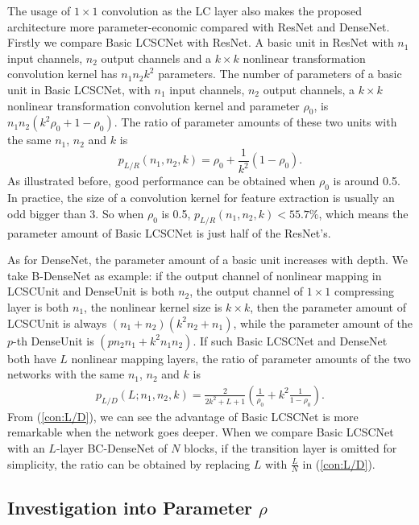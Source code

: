 \documentclass[journal]{IEEEtran}
\begin{document}
The usage of $1 \times 1$ convolution as the LC layer also makes the proposed architecture more parameter-economic compared with ResNet and DenseNet. Firstly we compare Basic LCSCNet with ResNet. A basic unit in ResNet with $n_1$ input channels, $n_2$ output channels and a $k\times k$ nonlinear transformation convolution kernel has $n_1 n_2 k^2$ parameters. The number of parameters of a basic unit in Basic LCSCNet, with $n_1$ input channels, $n_2$ output channels, a $k\times k$ nonlinear transformation convolution kernel and parameter $\rho_0$, is $n_1n_2(k^2\rho_0+1-\rho_0)$. The ratio of parameter amounts of these two units with the same $n_1$, $n_2$ and $k$ is 
\begin{equation}
p_{L/R}(n_1,n_2,k)=\rho_0+\frac{1}{k^2}(1-\rho_0).
\label{con:L/R}
\end{equation}
As illustrated before, good performance can be obtained when $\rho_0$ is around 0.5. In practice, the size of a convolution kernel for feature extraction is usually an odd bigger than 3. So when $\rho_0$ is 0.5, $p_{L/R}(n_1,n_2,k)<55.7\%$, which means the parameter amount of Basic LCSCNet is just half of the ResNet's. 

As for DenseNet, the parameter amount of a basic unit increases with depth. We take B-DenseNet as example: if the output channel of nonlinear mapping in LCSCUnit and DenseUnit is both $n_{2}$, the output channel of $1\times 1$ compressing layer is both $n_{1}$, the nonlinear kernel size is $k\times k$, then the parameter amount of LCSCUnit is always  $(n_{1}+n_{2})(k^{2}n_{2}+n_{1})$, while the parameter amount of the $p$-th DenseUnit is $(pn_{2}n_{1}+k^{2}n_{1}n_{2})$. If such Basic LCSCNet and DenseNet both have $L$ nonlinear mapping layers, the ratio of parameter amounts of the two networks with the same $n_{1}$, $n_{2}$ and $k$ is 
\begin{equation}
\begin{split}
p_{L/D}(L;n_1,n_2,k)=\frac{2}{2k^{2}+L+1}(\frac{1}{\rho_0}+k^{2}\frac{1}{1-\rho_0}).
\end{split}
\label{con:L/D}
\end{equation}
From (\ref{con:L/D}), we can see the advantage of Basic LCSCNet is more remarkable when the network goes deeper. 
When we compare Basic LCSCNet with an $L$-layer BC-DenseNet of $N$ blocks, if the transition layer is omitted for simplicity, the ratio can be obtained by replacing $L$ with $\frac{L}{N}$ in (\ref{con:L/D}).


 
\subsection{Investigation into Parameter $\rho$}\label{s:s_5::C}
\end{document}
